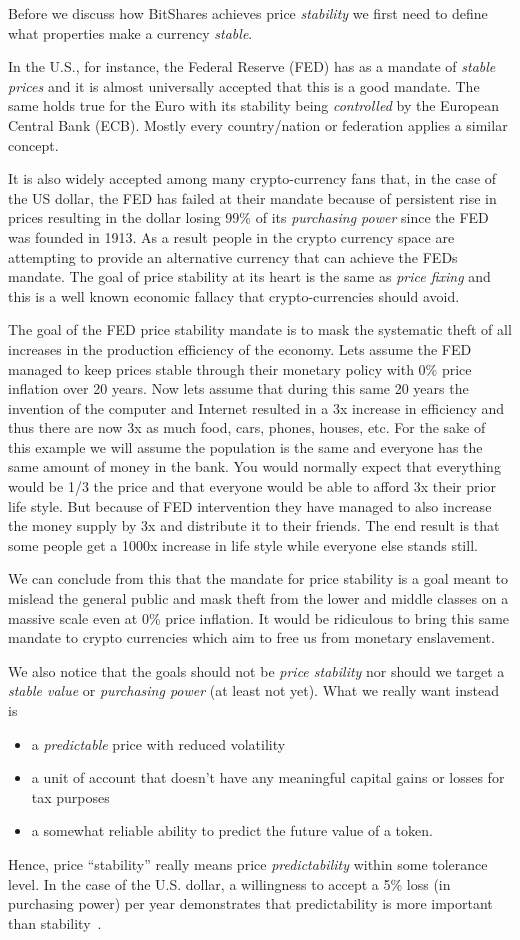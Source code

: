 Before we discuss how BitShares achieves price \emph{stability} we first need to
define what properties make a currency \emph{stable}.

In the U.S., for instance, the Federal Reserve (FED) has as a mandate of
\emph{stable prices} and it is almost universally accepted that this is a good
mandate. The same holds true for the Euro with its stability being
\emph{controlled} by the European Central Bank (ECB). Mostly every
country/nation or federation applies a similar concept.

It is also widely accepted among many crypto-currency fans that, in the case of
the US dollar, the FED has failed at their mandate because of persistent rise
in prices resulting in the dollar losing 99\% of its \emph{purchasing power}
since the FED was founded in 1913. As a result people in the crypto currency
space are attempting to provide an alternative currency that can achieve the
FEDs mandate. The goal of price stability at its heart is the same as
\emph{price fixing} and this is a well known economic fallacy that
crypto-currencies should avoid.

The goal of the FED price stability mandate is to mask the systematic theft of
all increases in the production efficiency of the economy. Lets assume the FED
managed to keep prices stable through their monetary policy with 0\% price
inflation over 20 years. Now lets assume that during this same 20 years the
invention of the computer and Internet resulted in a 3x increase in efficiency
and thus there are now 3x as much food, cars, phones, houses, etc. For the sake
of this example we will assume the population is the same and everyone has the
same amount of money in the bank. You would normally expect that everything
would be 1/3 the price and that everyone would be able to afford 3x their prior
life style. But because of FED intervention they have managed to also increase
the money supply by 3x and distribute it to their friends. The end result is
that some people get a 1000x increase in life style while everyone else stands
still.

We can conclude from this that the mandate for price stability is a goal meant
to mislead the general public and mask theft from the lower and middle classes
on a massive scale even at 0\% price inflation. It would be ridiculous to bring
this same mandate to crypto currencies which aim to free us from monetary
enslavement.

We also notice that the goals should not be \emph{price stability} nor should
we target a \emph{stable value} or \emph{purchasing power} (at least not yet). 
%
What we really want instead is 
\begin{itemize}
 \item a \emph{predictable} price with reduced volatility
 \item a unit of account that doesn't have any meaningful capital gains or
    losses for tax purposes
 \item a somewhat reliable ability to predict the future value of a token.
\end{itemize}

Hence, price ``stability'' really means price \emph{predictability} within some
tolerance level. In the case of the U.S. dollar, a willingness to accept a 5\%
loss (in purchasing power) per year demonstrates that predictability is more
important than stability~\cite{bm:stable:impossible}.
